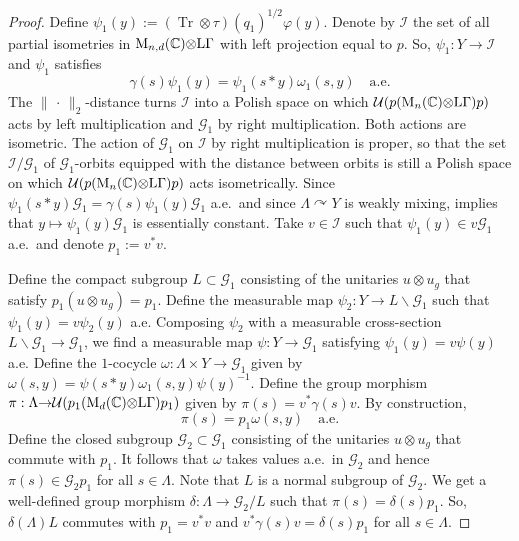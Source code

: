 \documentclass[a4paper,11pt]{amsart}
\numberwithin{equation}{section}
\begin{document}
\begin{proof}
Define $\psi_1(y) := ({\operatorname{Tr}} {\otimes} \tau)(q_1)^{1/2} {\varphi}(y)$. Denote by ${\mathcal{I}}$ the set of all partial isometries in ${\operatorname{M}}_{n,d}({\mathbb{C}}) {\otimes} {\mathord{\text{\rm L}}} \Gamma$ with left projection equal to $p$. So, $\psi_1 : Y {\rightarrow} {\mathcal{I}}$ and $\psi_1$ satisfies
$$\gamma(s) \psi_1(y) = \psi_1(s * y) \omega_1(s,y) \quad\text{a.e.}$$
The $\|\, \cdot\,\|_2$-distance turns ${\mathcal{I}}$ into a Polish space on which ${\mathcal{U}}(p({\operatorname{M}}_n({\mathbb{C}}) {\otimes} {\mathord{\text{\rm L}}} \Gamma)p)$ acts by left multiplication and ${\mathcal{G}}_1$ by right multiplication. Both actions are isometric. The action of ${\mathcal{G}}_1$ on ${\mathcal{I}}$ by right multiplication is proper, so that the set ${\mathcal{I}}/{\mathcal{G}}_1$ of ${\mathcal{G}}_1$-orbits equipped with the distance between orbits is still a Polish space on which ${\mathcal{U}}(p({\operatorname{M}}_n({\mathbb{C}}) {\otimes} {\mathord{\text{\rm L}}} \Gamma)p)$ acts isometrically. Since $\psi_1(s * y) {\mathcal{G}}_1 = \gamma(s) \psi_1(y) {\mathcal{G}}_1$ a.e.\ and since $\Lambda {\curvearrowright} Y$ is weakly mixing, \cite[Lemma 5.4]{PV08} implies that $y \mapsto \psi_1(y) {\mathcal{G}}_1$ is essentially constant. Take $v \in {\mathcal{I}}$ such that $\psi_1(y) \in v {\mathcal{G}}_1$ a.e.\ and denote $p_1 := v^* v$.

Define the compact subgroup $L \subset {\mathcal{G}}_1$ consisting of the unitaries $u {\otimes} u_g$ that satisfy $p_1 (u {\otimes} u_g) = p_1$. Define the measurable map $\psi_2 : Y {\rightarrow} L \backslash {\mathcal{G}}_1$ such that $\psi_1(y) = v \psi_2(y)$ a.e. Composing $\psi_2$ with a measurable cross-section $L \backslash {\mathcal{G}}_1 {\rightarrow} {\mathcal{G}}_1$, we find a measurable map $\psi : Y {\rightarrow} {\mathcal{G}}_1$ satisfying $\psi_1(y) = v \psi(y)$ a.e. Define the $1$-cocycle $\omega : \Lambda \times Y {\rightarrow} {\mathcal{G}}_1$ given by $\omega(s,y) = \psi(s * y) \omega_1(s,y) \psi(y)^{-1}$. Define the group morphism $\pi : \Lambda {\rightarrow} {\mathcal{U}}(p_1({\operatorname{M}}_d({\mathbb{C}}) {\otimes} {\mathord{\text{\rm L}}} \Gamma) p_1)$ given by $\pi(s) = v^* \gamma(s) v$. By construction,
$$\pi(s) = p_1 \omega(s,y) \quad\text{a.e.}$$
Define the closed subgroup ${\mathcal{G}}_2 \subset {\mathcal{G}}_1$ consisting of the unitaries $u {\otimes} u_g$ that commute with $p_1$. It follows that $\omega$ takes values a.e.\ in ${\mathcal{G}}_2$ and hence $\pi(s) \in {\mathcal{G}}_2 p_1$ for all $s \in \Lambda$. Note that $L$ is a normal subgroup of ${\mathcal{G}}_2$. We get a well-defined group morphism $\delta : \Lambda {\rightarrow} {\mathcal{G}}_2/L$ such that $\pi(s) = \delta(s) p_1$. So, $\delta(\Lambda)L$ commutes with $p_1 = v^* v$ and $v^* \gamma(s) v = \delta(s) p_1$ for all $s \in \Lambda$.


\end{proof}
\end{document}
